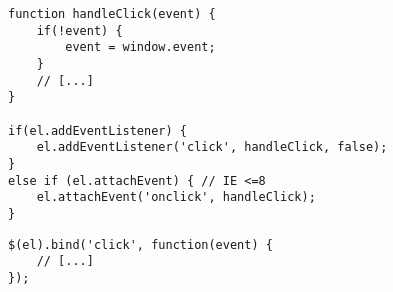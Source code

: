 \newpage
\begin{lstlisting}[label=lst:js-events-plain,caption=Event-Handling ohne Abstraktion]
function handleClick(event) {
    if(!event) {
        event = window.event;
    }
    // [...]
}

if(el.addEventListener) {
    el.addEventListener('click', handleClick, false);
}
else if (el.attachEvent) { // IE <=8
    el.attachEvent('onclick', handleClick);
}
\end{lstlisting}

\begin{lstlisting}[label=lst:js-events-jquery,caption=Event-Handling mit jQuery]
$(el).bind('click', function(event) {
    // [...]
});
\end{lstlisting}
